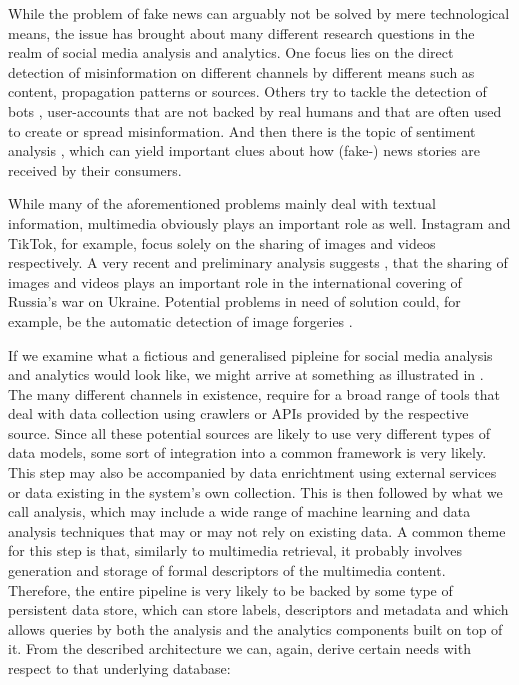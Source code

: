 While the problem of fake news can arguably not be solved by mere technological means, the issue has brought about many different research questions in the realm of social media analysis and analytics. One focus lies on the direct detection of misinformation on different channels \cite{Zhou:2020Survey} by different means such as content, propagation patterns or sources. Others try to tackle the detection of bots \cite{Cresci:2020Decade}, user-accounts that are not backed by real humans and that are often used to create or spread misinformation. And then there is the topic of sentiment analysis \cite{Yue:2019Survey}, which can yield important clues about how (fake-) news stories are received by their consumers.

While many of the aforementioned problems mainly deal with textual information, multimedia obviously plays an important role as well. Instagram and TikTok, for example, focus solely on the sharing of images and videos respectively. A very recent and preliminary analysis suggests \cite{Ciuriak:2022Role}, that the sharing of images and videos plays an important role in the international covering of Russia's war on Ukraine. Potential problems in need of solution could, for example, be the automatic detection of image forgeries \cite{Farid:2009Image}.

If we examine what a fictious and generalised pipleine for social media analysis and analytics would look like, we might arrive at something as illustrated in  \cite{Cui:2019Defend,Yang:2019XFake,Bagade:2020Kauwa}. The many different channels in existence, require for a broad range of tools that deal with data collection using crawlers or APIs provided by the respective source. Since all these potential sources are likely to use very different types of data models, some sort of integration into a common framework is very likely. This step may also be accompanied by data enrichtment using external services or data existing in the system's own collection. This is then followed by what we call analysis, which may include a wide range of machine learning and data analysis techniques that may or may not rely on existing data. A common theme for this step is that, similarly to multimedia retrieval, it probably involves generation and storage of formal descriptors of the multimedia content. Therefore, the entire pipeline is very likely to be backed by some type of persistent data store, which can store labels, descriptors and metadata and which allows queries by both the analysis and the analytics components built on top of it. From the described architecture we can, again, derive certain needs with respect to that underlying database: 


